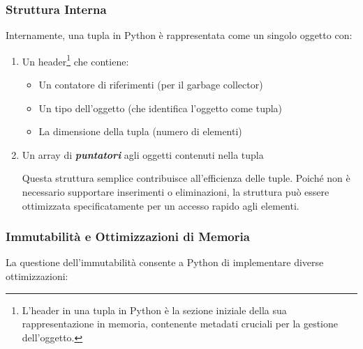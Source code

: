 \subsubsection{Struttura Interna}

Internamente, una tupla in Python è rappresentata come un singolo oggetto con:
\begin{enumerate}
    \item Un header\footnote{L'header in una tupla in Python è la sezione iniziale della sua rappresentazione in memoria, contenente metadati cruciali per la gestione dell'oggetto.} che contiene:
    \begin{itemize}
        \item Un contatore di riferimenti (per il garbage collector)
        \item Un tipo dell'oggetto (che identifica l'oggetto come tupla)
        \item La dimensione della tupla (numero di elementi)
    \end{itemize}
    \item Un array di \textit{\textbf{puntatori}} agli oggetti contenuti nella tupla

         Questa struttura semplice contribuisce all'efficienza delle tuple. Poiché non è necessario supportare inserimenti o eliminazioni, la struttura può essere ottimizzata specificatamente per un accesso rapido agli elementi. 

\end{enumerate}

\subsubsection{Immutabilità e Ottimizzazioni di Memoria}
La questione dell'immutabilità consente a Python di implementare diverse ottimizzazioni:

